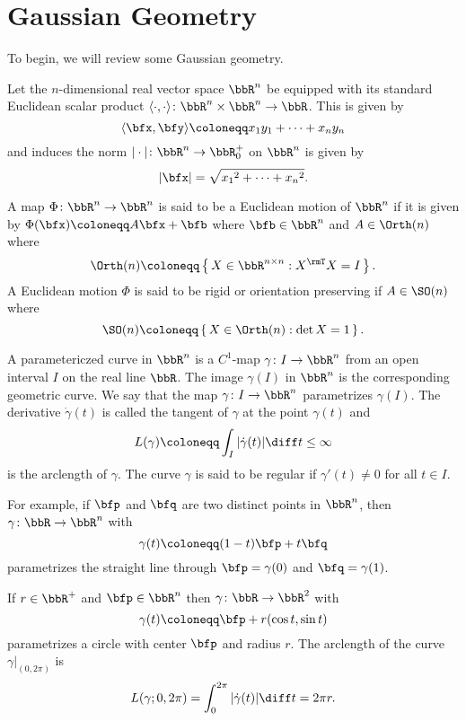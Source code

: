 \chapter{Gaussian Geometry}
To begin, we will review some Gaussian geometry.

Let the $n$-dimensional real vector space $\bbR^n$ be equipped with its
standard Euclidean scalar product
$\langle\cdot,\cdot\rangle\colon\bbR^n\times\bbR^n\to\bbR$. This is
given by
\[
\langle \bfx,\bfy \rangle\coloneqq x_1y_1+\dotsb+x_ny_n
\]
and induces the norm $|\cdot|\colon\bbR^n\to\bbR_0^+$ on $\bbR^n$ is given
by
\[
|\bfx|=\sqrt{{x_1}^2+\dotsb+{x_n}^2}.
\]

\begin{definition}
A map $\Phi\colon\bbR^n\to\bbR^n$ is said to be a Euclidean motion of
$\bbR^n$ if it is given by $\Phi(\bfx)\coloneqq A\bfx+\bfb$ where
$\bfb\in\bbR^n$ and $A\in\Orth(n)$ where
\[
\Orth(n)\coloneqq\left\{\,X\in\bbR^{n\times n}:X^\rmT X=I\,\right\}.
\]
A Euclidean motion $\Phi$ is said to be rigid or orientation preserving if
$A\in\SO(n)$ where
\[
\SO(n)\coloneqq\left\{\,X\in\Orth(n):{\det X=1}\,\right\}.
\]
\end{definition}

\begin{definition}
A parametericzed curve in $\bbR^n$ is a $C^1$-map $\gamma\colon I\to\bbR^n$
from an open interval $I$ on the real line $\bbR$. The image $\gamma(I)$ in
$\bbR^n$ is the corresponding geometric curve. We say that the map
$\gamma\colon I\to\bbR^n$ parametrizes $\gamma(I)$. The derivative
$\dot\gamma(t)$ is called the tangent of $\gamma$ at the point $\gamma(t)$ and
\[
L(\gamma)\coloneqq\int_I|\dot\gamma(t)|\diff t\leq\infty
\]
is the arclength of $\gamma$. The curve $\gamma$ is said to be regular if
$\gamma'(t)\neq 0$ for all $t\in I$.
\end{definition}

\begin{example}
For example, if $\bfp$ and $\bfq$ are two distinct points in $\bbR^n$, then
$\gamma\colon\bbR\to\bbR^n$ with
\[
\gamma(t)\coloneqq (1-t)\bfp+t\bfq
\]
parametrizes the straight line through $\bfp=\gamma(0)$ and
$\bfq=\gamma(1)$.
\end{example}

\begin{example}
If $r\in\bbR^+$ and $\bfp\in\bbR^n$ then $\gamma\colon\bbR\to\bbR^2$ with
\[
\gamma(t)\coloneqq\bfp+r(\cos t,\sin t)
\]
parametrizes a circle with center $\bfp$ and radius $r$. The arclength of
the curve $\gamma|_{(0,2\pi)}$ is
\[
L(\gamma;0,2\pi)=\int_0^{2\pi}|\dot\gamma(t)|\diff t=2\pi r.
\]
\end{example}

